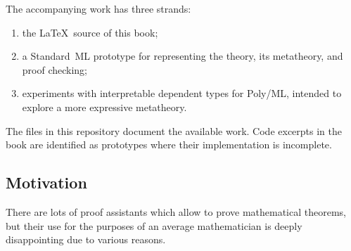 The accompanying work has three strands:
\begin{enumerate}
\item the \LaTeX\ source of this book;
\item a Standard~ML prototype for representing the theory, its metatheory,
  and proof checking;
\item experiments with interpretable dependent types for Poly/ML, intended
  to explore a more expressive metatheory.
\end{enumerate}
The files in this repository document the available work. Code excerpts in
the book are identified as prototypes where their implementation is
incomplete.

\iffalse
\subsection{Motivation}
There are lots of proof assistants which allow to prove mathematical theorems, but their use for the purposes of an average mathematician is deeply disappointing due to various reasons.\\

